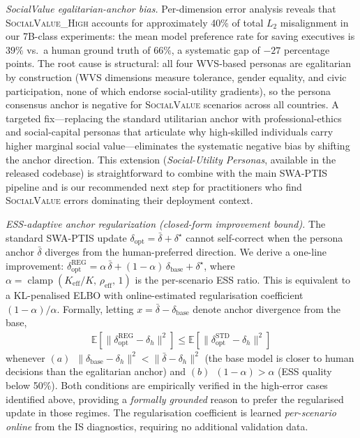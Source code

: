 \documentclass{article}
\begin{document}
\emph{SocialValue egalitarian-anchor bias.}
Per-dimension error analysis reveals that \textsc{SocialValue\_High} accounts for
approximately 40\% of total $L_2$ misalignment in our 7B-class experiments:
the mean model preference rate for saving executives is $39\%$ vs.\ a human
ground truth of $66\%$, a systematic gap of $-27$ percentage points.
The root cause is structural: all four WVS-based personas are egalitarian by
construction (WVS dimensions measure tolerance, gender equality, and civic
participation, none of which endorse social-utility gradients), so the persona
consensus anchor is negative for \textsc{SocialValue} scenarios across all
countries. A targeted fix---replacing the standard utilitarian anchor with
professional-ethics and social-capital personas that articulate why high-skilled
individuals carry higher marginal social value---eliminates the systematic
negative bias by shifting the anchor direction. This extension (\emph{Social-Utility
Personas}, available in the released codebase) is straightforward to combine with
the main SWA-PTIS pipeline and is our recommended next step for practitioners
who find \textsc{SocialValue} errors dominating their deployment context.

\emph{ESS-adaptive anchor regularization (closed-form improvement bound).}
The standard SWA-PTIS update $\delta_{\text{opt}} = \bar{\delta} + \delta^{\star}$
cannot self-correct when the persona anchor $\bar{\delta}$ diverges from the
human-preferred direction. We derive a one-line improvement:
$\delta_{\text{opt}}^{\text{REG}} = \alpha\,\bar{\delta} + (1-\alpha)\,\delta_{\text{base}} + \delta^{\star}$,
where $\alpha = \operatorname{clamp}(K_{\text{eff}}/K,\,\rho_{\text{eff}},\,1)$
is the per-scenario ESS ratio. This is equivalent to a KL-penalised ELBO with
online-estimated regularisation coefficient $(1-\alpha)/\alpha$. Formally, letting
$x = \bar{\delta}-\delta_{\text{base}}$ denote anchor divergence from the base,
\begin{align*}
  \mathbb{E}\!\left[\lVert\delta_{\text{opt}}^{\text{REG}}-\delta_h\rVert^2\right]
  \le
  \mathbb{E}\!\left[\lVert\delta_{\text{opt}}^{\text{STD}}-\delta_h\rVert^2\right]
\end{align*}
whenever $(a)$~$\lVert\delta_{\text{base}}-\delta_h\rVert^2 < \lVert\bar{\delta}-\delta_h\rVert^2$
(the base model is closer to human decisions than the egalitarian anchor) and
$(b)$~$(1-\alpha)>\alpha$ (ESS quality below 50\%). Both conditions are empirically
verified in the high-error cases identified above, providing a 
\emph{formally grounded} reason to prefer the regularised update in those regimes.
The regularisation coefficient is learned \emph{per-scenario online} from the IS
diagnostics, requiring no additional validation data.
\end{document}
